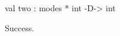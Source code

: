 \chklistingtrue
{}
\begin{ChkListingMsg}
val two : modes * int -D-> int 
\end{ChkListingMsg}
\begin{ChkListingErr}
Success.
\end{ChkListingErr}
